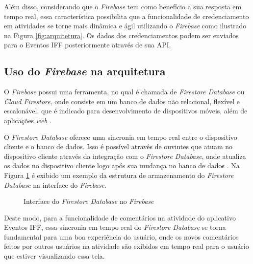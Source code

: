 Além disso, considerando que o \textit{Firebase} tem como benefício a sua resposta em tempo real, essa característica possibilita que a funcionalidade de credenciamento em atividades se torne mais dinâmica e ágil utilizando o \textit{Firebase} como ilustrado na Figura \ref{fig:arquitetura}. Os dados dos credenciamentos podem ser enviados para o Eventos IFF posteriormente através de sua API.

\subsection{Uso do \textit{Firebase} na arquitetura} \label{sec:firebase}

O \textit{Firebase} possui uma ferramenta, no qual é chamada de \textit{Firestore Database} ou \textit{Cloud Firestore}, onde consiste em um banco de dados não relacional, flexível e escalonável, que é indicado para desenvolvimento de dispositivos móveis, além de aplicações \textit{web} \cite{google_firebase}.

O \textit{Firestore Database} oferece uma sincronia em tempo real entre o dispositivo cliente e o banco de dados. Isso é possível através de ouvintes que atuam no dispositivo cliente através da integração com o \textit{Firestore Database}, onde atualiza os dados no dispositivo cliente logo após sua mudança no banco de dados \cite{google_firebase}. Na Figura \ref{fig:firebase} é exibido um exemplo da estrutura de armazenamento do \textit{Firestore Database} na interface do \textit{Firebase}.

\begin{figure}[H]
    \centering
    \caption{Interface do \textit{Firestore Database} no \textit{Firebase}}
    \label{fig:firebase}
\end{figure}

Deste modo, para a funcionalidade de comentários na atividade do aplicativo Eventos IFF, essa sincronia em tempo real do \textit{Firestore Database} se torna fundamental para uma boa experiência do usuário, onde os novos comentários feitos por outros usuários na atividade são exibidos em tempo real para o usuário que estiver visualizando essa tela.